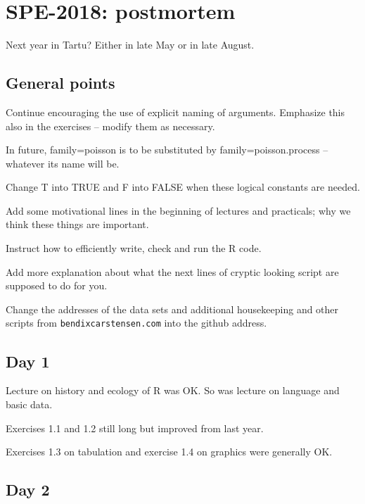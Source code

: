 

\section*{SPE-2018: postmortem}

Next year in Tartu? Either in late May or in late August. 

\subsection*{General points}


Continue encouraging the use
of explicit naming of arguments. Emphasize this also in the exercises -- modify them as necessary.

In future, family=poisson is to be substituted by family=poisson.process -- whatever its name will be.

Change T into TRUE and F into FALSE when these logical constants are needed.

Add some motivational lines in the beginning of lectures and practicals; 
why we think these things are important.

Instruct how to efficiently write, check and run the R code. 

Add more explanation about what the next lines of cryptic looking script are supposed to do for you.

Change the addresses of the data sets and additional housekeeping and other 
scripts from {\tt bendixcarstensen.com} into the github address.

\subsection*{Day 1}

Lecture on history and ecology of R was OK. So was lecture on language and basic data. 

Exercises 1.1 and 1.2 still long but improved from last year. 

Exercises 1.3 on tabulation and exercise 1.4 on graphics were generally OK. 

\subsection*{Day 2}


